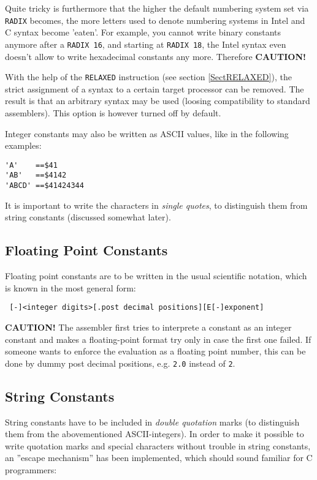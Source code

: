 \documentclass[12pt,twoside]{report}
\newcommand{\bb}[1]{{\bf #1}}
\newcommand{\tty}[1]{{\tt #1}}
\begin{document}
Quite tricky is furthermore that the higher the default numbering system
set via {\tt RADIX} becomes, the more letters used to denote numbering
systems in Intel and C syntax become 'eaten'.  For example, you cannot
write binary constants anymore after a {\tt RADIX 16}, and starting at
{\tt RADIX 18}, the Intel syntax even doesn't allow to write hexadecimal
constants any more.  Therefore {\bf CAUTION!}

With the help of the \tty{RELAXED} instruction (see section \ref{SectRELAXED}),
the strict assignment of a syntax to a certain target processor can be
removed.  The result is that an arbitrary syntax may be used (loosing
compatibility to standard assemblers).  This option is however turned off
by default.

Integer constants may also be written as ASCII values, like in
the following examples:
\begin{verbatim}
'A'    ==$41
'AB'   ==$4142
'ABCD' ==$41424344
\end{verbatim}
It is important to write the characters in {\em single quotes}, to 
distinguish them from string constants (discussed somewhat later).

\subsection{Floating Point Constants}

Floating point constants are to be written in the usual scientific 
notation, which is known in the most general form:
\begin{verbatim}
 [-]<integer digits>[.post decimal positions][E[-]exponent]
\end{verbatim}
\bb{CAUTION!} The assembler first tries to interprete a constant as an
integer constant and makes a floating-point format try only in case
the first one failed.  If someone wants to enforce the evaluation as
a floating point number, this can be done by dummy post decimal
positions, e.g.  \tty{2.0} instead of \tty{2}.

\subsection{String Constants}
\label{SectStringConsts}

String constants have to be included in {\em double quotation} marks (to
distinguish them from the abovementioned ASCII-integers). In order to 
make it possible to write quotation marks and special characters without 
trouble in string constants, an ''escape mechanism'' has been implemented, 
which should sound familiar for C programmers: 
\end{document}
